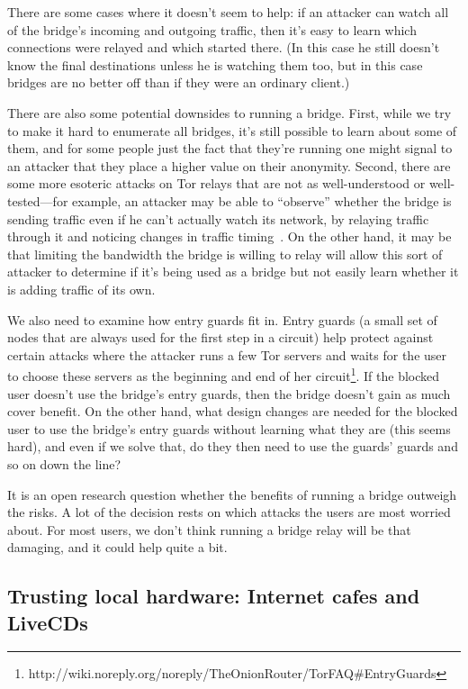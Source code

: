 \documentclass{llncs}
\begin{document}
There are some cases where it doesn't seem to help: if an attacker can
watch all of the bridge's incoming and outgoing traffic, then it's easy
to learn which connections were relayed and which started there. (In this
case he still doesn't know the final destinations unless he is watching
them too, but in this case bridges are no better off than if they were
an ordinary client.)

There are also some potential downsides to running a bridge. First, while
we try to make it hard to enumerate all bridges, it's still possible to
learn about some of them, and for some people just the fact that they're
running one might signal to an attacker that they place a higher value
on their anonymity. Second, there are some more esoteric attacks on Tor
relays that are not as well-understood or well-tested---for example, an
attacker may be able to ``observe'' whether the bridge is sending traffic
even if he can't actually watch its network, by relaying traffic through
it and noticing changes in traffic timing~\cite{attack-tor-oak05}. On
the other hand, it may be that limiting the bandwidth the bridge is
willing to relay will allow this sort of attacker to determine if it's
being used as a bridge but not easily learn whether it is adding traffic
of its own.

We also need to examine how entry guards fit in. Entry guards
(a small set of nodes that are always used for the first
step in a circuit) help protect against certain attacks
where the attacker runs a few Tor servers and waits for
the user to choose these servers as the beginning and end of her
circuit\footnote{http://wiki.noreply.org/noreply/TheOnionRouter/TorFAQ\#EntryGuards}.
If the blocked user doesn't use the bridge's entry guards, then the bridge
doesn't gain as much cover benefit. On the other hand, what design changes
are needed for the blocked user to use the bridge's entry guards without
learning what they are (this seems hard), and even if we solve that,
do they then need to use the guards' guards and so on down the line?

It is an open research question whether the benefits of running a bridge
outweigh the risks. A lot of the decision rests on which attacks the
users are most worried about. For most users, we don't think running a
bridge relay will be that damaging, and it could help quite a bit.

\subsection{Trusting local hardware: Internet cafes and LiveCDs}
\label{subsec:cafes-and-livecds}
\end{document}
